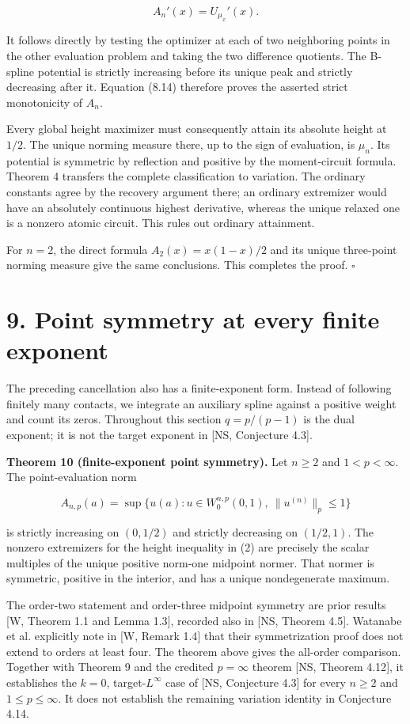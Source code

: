 \documentclass[11pt]{article}
\begin{document}
\[
A_n'(x)=U_{\mu_x}'(x).
\tag{8.15}
\]

It follows directly by testing the optimizer at each of two neighboring
points in the other evaluation problem and taking the two difference
quotients. The B-spline potential is strictly increasing before its
unique peak and strictly decreasing after it. Equation (8.14) therefore
proves the asserted strict monotonicity of \(A_n\).

Every global height maximizer must consequently attain its absolute
height at \(1/2\). The unique norming measure there, up to the sign of
evaluation, is \(\mu_n\). Its potential is symmetric by reflection and
positive by the moment-circuit formula. Theorem 4 transfers the complete
classification to variation. The ordinary constants agree by the
recovery argument there; an ordinary extremizer would have an absolutely
continuous highest derivative, whereas the unique relaxed one is a
nonzero atomic circuit. This rules out ordinary attainment.

For \(n=2\), the direct formula \(A_2(x)=x(1-x)/2\) and its unique
three-point norming measure give the same conclusions. This completes
the proof. \(\square\)

\section{9. Point symmetry at every finite
exponent}\label{point-symmetry-at-every-finite-exponent}

The preceding cancellation also has a finite-exponent form. Instead of
following finitely many contacts, we integrate an auxiliary spline
against a positive weight and count its zeros. Throughout this section
\(q=p/(p-1)\) is the dual exponent; it is not the target exponent in
{[}NS, Conjecture 4.3{]}.

\textbf{Theorem 10 (finite-exponent point symmetry).} Let \(n\ge2\) and
\(1<p<\infty\). The point-evaluation norm

\[
A_{n,p}(a)=\sup\{u(a):u\in W_0^{n,p}(0,1),\ \|u^{(n)}\|_p\le1\}
\tag{9.1}
\]

is strictly increasing on \((0,1/2)\) and strictly decreasing on
\((1/2,1)\). The nonzero extremizers for the height inequality in (2)
are precisely the scalar multiples of the unique positive norm-one
midpoint normer. That normer is symmetric, positive in the interior, and
has a unique nondegenerate maximum.

The order-two statement and order-three midpoint symmetry are prior
results {[}W, Theorem 1.1 and Lemma 1.3{]}, recorded also in {[}NS,
Theorem 4.5{]}. Watanabe et al. explicitly note in {[}W, Remark 1.4{]}
that their symmetrization proof does not extend to orders at least four.
The theorem above gives the all-order comparison. Together with Theorem
9 and the credited \(p=\infty\) theorem {[}NS, Theorem 4.12{]}, it
establishes the \(k=0\), target-\(L^\infty\) case of {[}NS, Conjecture
4.3{]} for every \(n\ge2\) and \(1\le p\le\infty\). It does not
establish the remaining variation identity in Conjecture 4.14.
\end{document}
